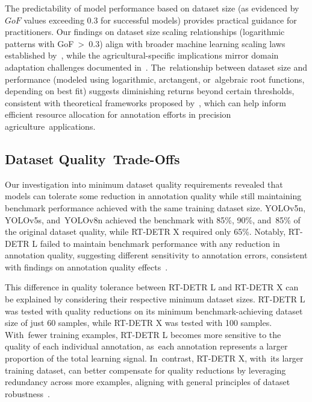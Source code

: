 \documentclass[12pt,a4paper,oneside]{report}
\begin{document}
The predictability of model performance based on dataset size (as evidenced by $GoF$ values exceeding 0.3 
for successful models) provides practical guidance for practitioners. Our findings on dataset size scaling 
relationships (logarithmic patterns with \mbox{GoF %
 > 0.3}) align with broader machine learning scaling laws 
established by~\cite{sunRevisitingUnreasonableEffectiveness2017,hestnessDeepLearningScaling2017}, 
while the agricultural-specific implications mirror domain adaptation challenges documented in~\cite{davidPlantDetectionCounting2021,andvaagCountingCanolaGeneralizable2024}. The~relationship 
between dataset size and performance (modeled using logarithmic, arctangent, or~algebraic root 
functions, depending on best fit) suggests diminishing returns beyond certain thresholds, consistent 
with theoretical frameworks proposed by~\cite{mahmoodHowMuchMore2022}, which can help inform efficient 
resource allocation for annotation efforts in precision agriculture~applications.

\subsection{Dataset Quality~Trade-Offs}
Our investigation into minimum dataset quality requirements revealed that models can tolerate some reduction 
in annotation quality while still maintaining benchmark performance achieved with the
same training dataset size. YOLOv5n, YOLOv5s, and~YOLOv8n achieved 
the benchmark with 85\%, 90\%, and~85\% of the original dataset quality, while RT-DETR X required 
only 65\%. Notably, RT-DETR L failed to maintain benchmark performance with any reduction in annotation quality, 
suggesting different sensitivity to annotation errors, consistent with findings on annotation quality 
effects~\cite{alhazmiEffectsAnnotationQuality2021}.

This difference in quality tolerance between RT-DETR L and RT-DETR X can be explained by considering their 
respective minimum dataset sizes. RT-DETR L was tested with quality reductions on its minimum benchmark-achieving 
dataset size of just 60 samples, while RT-DETR X was tested with 100 samples. With~fewer training examples, 
RT-DETR L becomes more sensitive to the quality of each individual annotation, as~each annotation represents 
a larger proportion of the total learning signal. In~contrast, RT-DETR X, with~its larger training dataset, 
can better compensate for quality reductions by leveraging redundancy across more examples, aligning with 
general principles of dataset robustness~\cite{sunRevisitingUnreasonableEffectiveness2017}.
\end{document}
